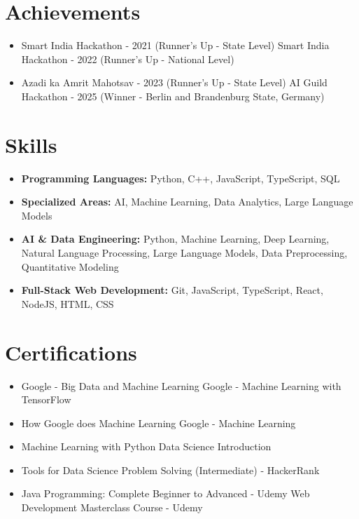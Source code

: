 \documentclass[a4paper,10pt]{article}
\begin{document}
\section*{Achievements}
\begin{itemize}
\item Smart India Hackathon - 2021 (Runner's Up - State Level) \hfill Smart India Hackathon - 2022 (Runner's Up - National Level)
\item Azadi ka Amrit Mahotsav - 2023 (Runner's Up - State Level) \hfill AI Guild Hackathon - 2025 (Winner - Berlin and Brandenburg State, Germany)
\end{itemize}

\section*{Skills}
\begin{itemize}
  \item \textbf{Programming Languages:} Python, C++, JavaScript, TypeScript, SQL
  \item \textbf{Specialized Areas:} AI, Machine Learning, Data Analytics, Large Language Models
  \item \textbf{AI \& Data Engineering:} Python, Machine Learning, Deep Learning, Natural Language Processing, Large Language Models, Data Preprocessing, Quantitative Modeling
  \item \textbf{Full-Stack Web Development:} Git, JavaScript, TypeScript, React, NodeJS, HTML, CSS
\end{itemize}

\section*{Certifications}
\begin{itemize}
\item Google - Big Data and Machine Learning \hfill Google - Machine Learning with TensorFlow
\item How Google does Machine Learning \hfill Google - Machine Learning
\item Machine Learning with Python \hfill Data Science Introduction
\item Tools for Data Science \hfill Problem Solving (Intermediate) - HackerRank
\item Java Programming: Complete Beginner to Advanced - Udemy \hfill Web Development Masterclass Course - Udemy
\end{itemize}
\end{document}
